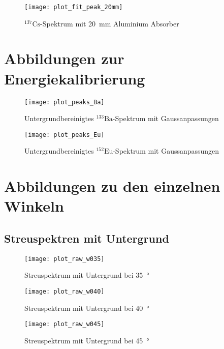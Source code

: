 \documentclass[11pt, ngerman, fleqn, DIV=15, headinclude, BCOR=2cm]{scrreprt}
\begin{document}
\begin{appendix}
\begin{figure}[h]
    \centering
    \texttt{[image: plot\_fit\_peak\_20mm]}
    \caption{%
	    $^{137}\text{Cs}$-Spektrum mit \SI{20}{\milli\metre} Aluminium
	    Absorber
   }
    \label{fig:plot_fit_peak_20mm}
\end{figure}

\clearpage

\section{Abbildungen zur Energiekalibrierung} \label{anhang-energiekalibrierung}
\begin{figure}[h]
    \centering
    \texttt{[image: plot\_peaks\_Ba]}
    \caption{%
	    Untergrundbereinigtes $^{133}\text{Ba}$-Spektrum mit
	    Gaussanpassungen
   }
    \label{fig:plot_peaks_Ba}
\end{figure}

\begin{figure}[h]
    \centering
    \texttt{[image: plot\_peaks\_Eu]}
    \caption{%
	    Untergrundbereinigtes $^{152}\text{Eu}$-Spektrum mit
	    Gaussanpassungen
    }
    \label{fig:plot_peaks_Eu}
\end{figure}

\clearpage

\section{Abbildungen zu den einzelnen Winkeln}\label{anhang-streuspektren}
\subsection{Streuspektren mit Untergrund}
\label{anhang-streuspektren-untergrund}
\begin{figure}[h]
    \centering
    \texttt{[image: plot\_raw\_w035]}
    \caption{%
	    Streuspektrum mit Untergrund bei \SI{35}{\degree}
    }
    \label{fig:plot_raw_w035}
\end{figure}

\begin{figure}[h]
    \centering
    \texttt{[image: plot\_raw\_w040]}
    \caption{%
	    Streuspektrum mit Untergrund bei \SI{40}{\degree}
    }
    \label{fig:plot_raw_w040}
\end{figure}

\begin{figure}[h]
    \centering
    \texttt{[image: plot\_raw\_w045]}
    \caption{%
	    Streuspektrum mit Untergrund bei \SI{45}{\degree}
    }
    \label{fig:plot_raw_w045}
\end{figure}


\end{appendix}
\end{document}
